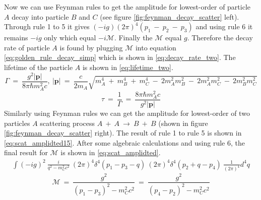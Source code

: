 Now we can use Feynman rules to get the amplitude for lowest-order of particle $A$ decay into particle $B$ and $C$ (see figure \ref{fig:feynman_decay_scatter} left). Through rule 1 to 5 it gives $(-ig)(2\pi)^{4}(p_{1}~-~p_{2}~-~p_{3})$ and using rule 6 it remains $-ig$ only which equal $-i\mathcal{M}$. Finally the $\mathcal{M}$ equal $g$.
Therefore the decay rate of particle $A$ is found by plugging $\mathcal{M}$ into equation \ref{eq:golden_rule_decay_simp} which is shown in \ref{eq:decay_rate_two}.
The lifetime of the particle $A$ is shown in \ref{eq:lifetime_two}.
\begin{equation}
\Gamma~=~\frac{g^{2}|\mathbf{p}|}{8\pi\hbar m_{A}^{2}c},~|\mathbf{p}|~=~\frac{c}{2m_{A}}\sqrt{m_{A}^{4}~+~m_{B}^{4}~+~m_{C}^{4}~-~2m_{A}^{2}m_{B}^{2}~-~2m_{A}^{2}m_{C}^{2}~-~2m_{B}^{2}m_{C}^{2}}
\label{eq:decay_rate_two}
\end{equation}
\begin{equation}
\tau~=~\frac{1}{\Gamma}~=~\frac{8\pi\hbar m_{A}^{2}c}{g^{2}|\mathbf{p}|}
\label{eq:lifetime_two}
\end{equation}
Similarly using Feynman rules we can get the amplitude for lowest-order of two particles $A$ scattering process $A~+~A~\rightarrow~B~+~B$ (shown in figure \ref{fig:feynman_decay_scatter} right). The result of rule 1 to rule 5 is shown in \ref{eq:scat_amplidted15}. After some algebraic calculations and using rule 6, the final result for $\mathcal{M}$ is shown in \ref{eq:scat_amplidted}.
\begin{equation}
\begin{split}
\int(-ig)^{2}~\frac{i}{q^{2}-m_{C}^{2}c^{2}}~(2\pi)^{4}\delta^{4}(p_{1}-p_{3}-q)~(2\pi)^{4}\delta^{4}(p_{2}+q-p_{4})~\frac{1}{(2\pi)^{4}}d^{4}q
\end{split}
\label{eq:scat_amplidted15}
\end{equation}
\begin{equation}
\mathcal{M}~=~\frac{g^{2}}{(p_{1}-p_{3})^{2}-m_{C}^{2}c^{2}}~=~\frac{g^{2}}{(p_{4}-p_{2})^{2}-m_{C}^{2}c^{2}}
\label{eq:scat_amplidted}
\end{equation}


